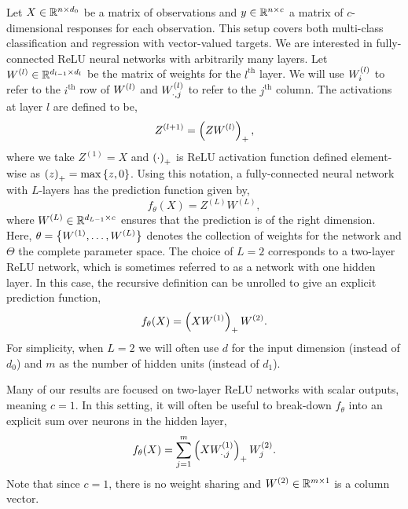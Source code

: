 
Let \( X \in \mathbb{R}^{n \times d_0} \) be a matrix of observations and \( y \in
\mathbb{R}^{n \times c} \) a matrix of \( c \)-dimensional responses for each
observation.
This setup covers both multi-class classification and regression with
vector-valued targets.
We are interested in fully-connected ReLU neural networks with arbitrarily many
layers.
Let \( W^{(l)} \in \mathbb{R}^{d_{l-1} \times d_{l}} \) be the matrix of weights for the
\( l^{\text{th}} \) layer.
We will use \( W^{(l)}_{i} \) to refer to the \( i^{\text{th}} \) row of \( W^{(l)} \)
and \( W^{(l)}_{\cdot, j} \) to refer to the \( j^{\text{th}} \) column.
The activations at layer $l$ are defined to be,
\begin{equation}\label{eq:activations}
    Z^{(l+1)} = \left(Z W^{(l)}\right)_+,
\end{equation}
where we take \( Z^{(1)} = X \) and \( \left(\cdot\right)_+ \) is ReLU activation
function defined element-wise as \( \left(z\right)_+ = \max\left\{z, 0\right\} \).
Using this notation, a fully-connected neural network with \( L \)-layers has
the prediction function given by,
\begin{equation}\label{eq:predictions}
    f_\theta(X) = Z^{(L)} W^{(L)},
\end{equation}
where \( W^{(L)} \in \mathbb{R}^{d_{L-1} \times c} \) ensures
that the prediction is of the right dimension.
Here, \( \theta = \left\{W^{(1)}, \ldots, W^{(L)}\right\} \) denotes the collection of
weights for the network and \( \Theta \) the complete parameter space.
The choice of \( L = 2 \) corresponds to a two-layer ReLU network,
which is sometimes referred to as a network with one hidden layer.
In this case, the recursive definition can be unrolled to give an explicit
prediction function,
\begin{equation}\label{eq:two-layer-vector-output}
    f_\theta(X) = \left(X W^{(1)}\right)_+ W^{(2)}.
\end{equation}
For simplicity, when \( L = 2 \) we will often use \( d \) for the input
dimension (instead of \( d_0 \)) and \( m \) as the number of hidden units
(instead of \( d_1 \)).

Many of our results are focused on two-layer ReLU networks with scalar
outputs, meaning \( c = 1 \).
In this setting, it will often be useful to break-down \( f_\theta \) into
an explicit sum over neurons in the hidden layer,
\begin{equation}\label{eq:two-layer-scalar-output}
    f_\theta(X) = \sum_{j = 1}^{m} \left(X W^{(1)}_{\cdot, j}\right)_+ W^{(2)}_{j}.
\end{equation}
Note that since \( c = 1 \), there is no weight sharing and
\( W^{(2)} \in \mathbb{R}^{m \times 1} \) is a column vector.

